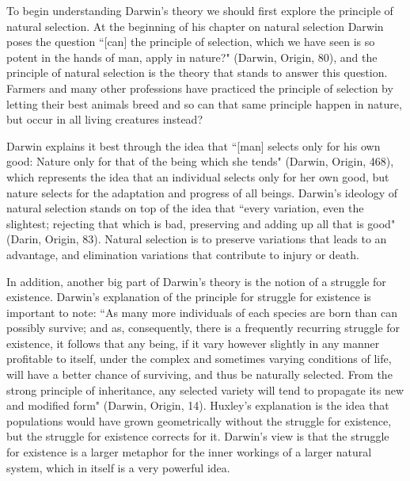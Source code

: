 \documentclass[11pt, oneside]{article}
\begin{document}
\par To begin understanding Darwin's theory we should first explore the principle of natural selection. At the beginning of his chapter on natural selection Darwin poses the question ``[can] the principle of selection, which we have seen is so potent in the hands of man, apply in nature?" (Darwin, Origin, 80), and the principle of natural selection is the theory that stands to answer this question. Farmers and many other professions have practiced the principle of selection by letting their best animals breed and so can that same principle happen in nature, but occur in all living creatures instead? 

\par Darwin explains it best through the idea that ``[man] selects only for his own good: Nature only for that of the being which she tends" (Darwin, Origin, 468), which represents the idea that an individual selects only for her own good, but nature selects for the adaptation and progress of all beings. Darwin's ideology of natural selection stands on top of the idea that ``every variation, even the slightest; rejecting that which is bad, preserving and adding up all that is good" (Darin, Origin, 83). Natural selection is to preserve variations that leads to an advantage, and elimination variations that contribute to injury or death. 

\par In addition, another big part of Darwin's theory is the notion of a struggle for existence. Darwin's explanation of the principle for struggle for existence is important to note: ``As many more individuals of each species are born than can possibly survive; and as, consequently, there is a frequently recurring struggle for existence, it follows that any being, if it vary however slightly in any manner profitable to itself, under the complex and sometimes varying conditions of life, will have a better chance of surviving, and thus be naturally selected. From the strong principle of inheritance, any selected variety will tend to propagate its new and modified form" (Darwin, Origin, 14). Huxley's explanation is the idea that populations would have grown geometrically without the struggle for existence, but the struggle for existence corrects for it. Darwin's view is that the struggle for existence is a larger metaphor for the inner workings of a larger natural system, which in itself is a very powerful idea.

\end{document}
